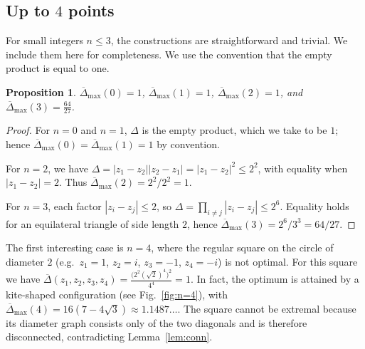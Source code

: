 \documentclass{article}
\newtheorem{proposition}[thr]{Proposition}
\theoremstyle{definition}
\let\le\leqslant
\let\leq\leqslant
\begin{document}
\subsection{Up to $4$ points}

For small integers \(n\leq 3\), the constructions are straightforward and trivial.
We include them here for completeness.
We use the convention that the empty product is equal to one.
\begin{proposition}
\(\overline{\Delta}_\max (0)= 1\),
\(\overline{\Delta}_\max (1)= 1\), \(\overline{\Delta}_\max (2)= 1\), and \(\overline{\Delta}_\max (3)= \frac{64}{27}\).
\end{proposition}
\begin{proof}
For $n=0$ and $n=1$, $\Delta$ is the empty product, which we take to be $1$; hence
$\overline\Delta_{\max}(0)=\overline\Delta_{\max}(1)=1$ by convention.

For $n=2$, we have $\Delta=|z_1-z_2||z_2-z_1|=|z_1-z_2|^2\le 2^2$, with equality when
$|z_1-z_2|=2$. Thus $\overline\Delta_{\max}(2)=2^2/2^2=1$.

For $n=3$, each factor $|z_i-z_j|\le 2$, so
$\Delta=\prod_{i\ne j}|z_i-z_j|\le 2^{6}$.
Equality holds for an equilateral triangle of side length $2$, hence
$\overline\Delta_{\max}(3)=2^6/3^3=64/27$.
\end{proof}




The first interesting case is $n=4$, where the regular square on the circle of diameter $2$ (e.g.\ $z_1=1$, $z_2=i$, $z_3=-1$, $z_4=-i$) is not optimal. For this square we have \(\overline\Delta(z_1,z_2,z_3,z_4)=\frac{\bigl(2^2(\sqrt2)^4\bigr)^2}{4^4}=1\). In fact, the optimum is attained by a kite-shaped configuration (see Fig.~\ref{fig:n=4}), with $\overline\Delta_{\max}(4)=16(7-4\sqrt3)\approx 1.1487\ldots$.
The square cannot be extremal because its diameter graph consists only of the two diagonals and is therefore disconnected, contradicting Lemma~\ref{lem:conn}.
\end{document}
